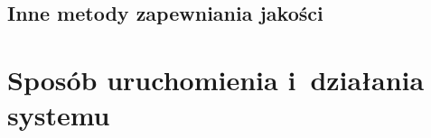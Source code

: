 \subsection{Inne metody zapewniania jakości}
\label{Chapter714}


\section{Sposób uruchomienia i~działania systemu}
\label{Chapter72}

